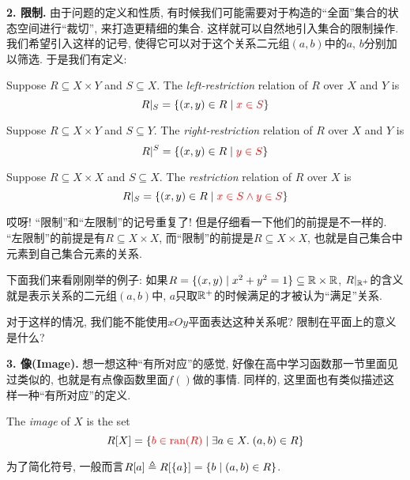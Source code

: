 \textbf{2. 限制. } 由于问题的定义和性质, 有时候我们可能需要对于构造的``全面''集合的状态空间进行``裁切'', 来打造更精细的集合. 这样就可以自然地引入集合的限制操作. 我们希望引入这样的记号, 使得它可以对于这个关系二元组$(a,b)$中的$a$, $b$分别加以筛选. 于是我们有定义: 

\begin{definition}
  Suppose $R \subseteq X \times Y$ and $S \subseteq X$.
  The {\it left-restriction} relation of $R$  over $X$ and $Y$ is
  \[
    R|_{S} = \{(x, y) \in R \mid \textcolor{red}{x \in S}\}
  \]
\end{definition}

\begin{definition}
  Suppose $R \subseteq X \times Y$ and $S \subseteq Y$.
  The {\it right-restriction} relation of $R$  over $X$ and $Y$ is
  \[
    R|^{S} = \{(x, y) \in R \mid \textcolor{red}{y \in S}\}
  \]
\end{definition}

\begin{definition}[限制 (Restriction)]
  Suppose $R \subseteq X \times X$ and $S \subseteq X$.
  The {\it restriction} relation of $R$  over $X$ is
  \[
    R|_{S} = \{(x, y) \in R \mid \textcolor{red}{x \in S \land y \in S}\}
  \]
\end{definition}

哎呀! ``限制''和``左限制''的记号重复了! 但是仔细看一下他们的前提是不一样的. ``左限制''的前提是有$R \subseteq X \times X$, 而``限制''的前提是$R \subseteq X \times X$, 也就是自己集合中元素到自己集合元素的关系. 

下面我们来看刚刚举的例子: 如果$R = \{(x, y) \mid x^2 + y^2 = 1\} \subseteq \mathbb{R} \times \mathbb{R}$, $R|_{\mathbb{R}^{+}}$的含义就是表示关系的二元组$(a,b)中$, $a$只取$\mathbb{R}^+$的时候满足的才被认为``满足''关系. 

\begin{bonus}
对于这样的情况, 我们能不能使用$xOy$平面表达这种关系呢? 限制在平面上的意义是什么? 
\end{bonus}

\vspace*{1pt}
\textbf{3. 像(Image). } 想一想这种``有所对应''的感觉, 好像在高中学习函数那一节里面见过类似的, 也就是有点像函数里面$f()$做的事情.  同样的, 这里面也有类似描述这样一种``有所对应''的定义. 

\begin{definition}[像 (Image)]
  The {\it image} of $X$  is the set
  \[
    R[X] = \{\textcolor{red}{b \in \text{ran}(R)} \mid \exists a \in X.\; (a, b) \in R\}
  \]
\end{definition}
为了简化符号, 一般而言$R[a] \triangleq R[\{a\}] = \{b \mid (a, b) \in R\}$. 


